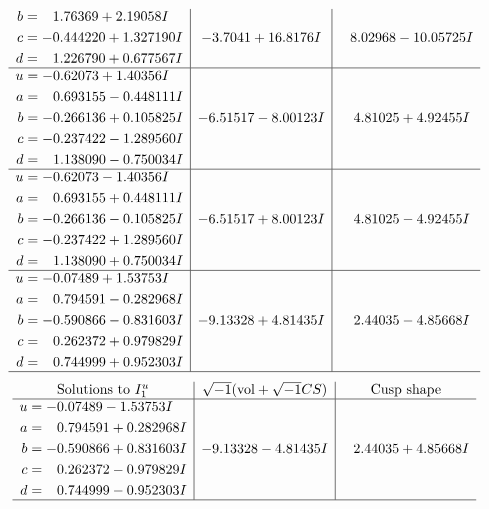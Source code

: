 \documentclass[1p]{elsarticle_modified}
\theoremstyle{definition}
\newcommand{\I}{\sqrt{-1}}
\begin{document}
$$\begin{array}{c|c|c}
\begin{aligned}
b &= \phantom{-}1.76369 + 2.19058 I \\
c &= -0.444220 + 1.327190 I \\
d &= \phantom{-}1.226790 + 0.677567 I\end{aligned}
 & -3.7041 + 16.8176 I & \phantom{-}8.02968 - 10.05725 I \\ \hline\begin{aligned}
u &= -0.62073 + 1.40356 I \\
a &= \phantom{-}0.693155 - 0.448111 I \\
b &= -0.266136 + 0.105825 I \\
c &= -0.237422 - 1.289560 I \\
d &= \phantom{-}1.138090 - 0.750034 I\end{aligned}
 & -6.51517 - 8.00123 I & \phantom{-}4.81025 + 4.92455 I \\ \hline\begin{aligned}
u &= -0.62073 - 1.40356 I \\
a &= \phantom{-}0.693155 + 0.448111 I \\
b &= -0.266136 - 0.105825 I \\
c &= -0.237422 + 1.289560 I \\
d &= \phantom{-}1.138090 + 0.750034 I\end{aligned}
 & -6.51517 + 8.00123 I & \phantom{-}4.81025 - 4.92455 I \\ \hline\begin{aligned}
u &= -0.07489 + 1.53753 I \\
a &= \phantom{-}0.794591 - 0.282968 I \\
b &= -0.590866 - 0.831603 I \\
c &= \phantom{-}0.262372 + 0.979829 I \\
d &= \phantom{-}0.744999 + 0.952303 I\end{aligned}
 & -9.13328 + 4.81435 I & \phantom{-}2.44035 - 4.85668 I\\
 \hline 
 \end{array}$$\newpage$$\begin{array}{c|c|c}  
\text{Solutions to }I^u_{1}& \I (\text{vol} + \sqrt{-1}CS) & \text{Cusp shape}\\
 \hline 
\begin{aligned}
u &= -0.07489 - 1.53753 I \\
a &= \phantom{-}0.794591 + 0.282968 I \\
b &= -0.590866 + 0.831603 I \\
c &= \phantom{-}0.262372 - 0.979829 I \\
d &= \phantom{-}0.744999 - 0.952303 I\end{aligned}
 & -9.13328 - 4.81435 I & \phantom{-}2.44035 + 4.85668 I\\
 \hline 
 \end{array}$$\newpage\newpage\renewcommand{\arraystretch}{1}
\end{document}
